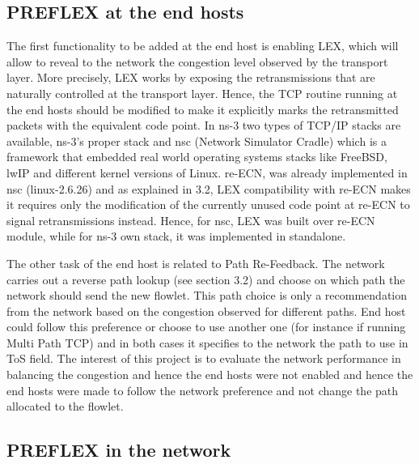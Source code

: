 \subsection{PREFLEX at the end hosts}

The first functionality to be added at the end host is enabling LEX, which will allow to reveal to the network the congestion level observed by the transport layer. More precisely, LEX works by exposing the retransmissions that are naturally controlled at the transport layer.  Hence, the TCP routine running at the end hosts should be modified to make it explicitly marks the retransmitted packets with the equivalent code point. In ns-3 two types of TCP/IP stacks are available, ns-3's proper stack and nsc (Network Simulator Cradle) which is a framework that embedded real world operating systems stacks like FreeBSD, lwIP and different kernel versions of Linux. re-ECN, was already implemented in nsc (linux-2.6.26) and as explained in 3.2, LEX compatibility with re-ECN makes it requires only the modification of the currently unused code point at re-ECN to signal retransmissions instead. Hence, for nsc, LEX was built over re-ECN module, while for ns-3 own stack, it was implemented in standalone.

The other task of the end host is related to Path Re-Feedback. The network carries out a reverse path lookup (see section 3.2) and choose on which path the network should send the new flowlet. This path choice is only a recommendation from the network based on the congestion observed  for different paths. End host could follow this preference or choose to use another one (for instance if running Multi Path TCP) and in both cases it specifies to the network the path to use in ToS field. The interest of this project is to evaluate the network performance in balancing the congestion and hence the end hosts were not enabled and hence the end hosts were made to follow the network preference and not change the path allocated to the flowlet. 

\subsection{PREFLEX in the network}

